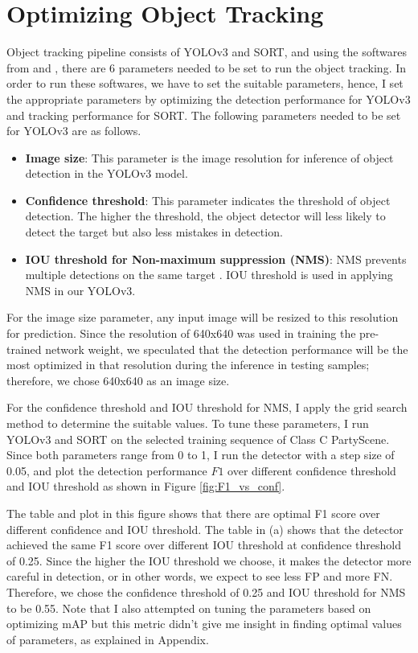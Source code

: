\section{Optimizing Object Tracking}
\label{sec:methods/section_b}

Object tracking pipeline consists of YOLOv3 and SORT, and using the softwares from \cite{jocher_ultralyticsyolov3_2021} and \cite{abewley_abewleysort_2021}, there are 6 parameters needed to be set to run the object tracking. In order to run these softwares, we have to set the suitable parameters, hence, I set the appropriate parameters by optimizing the detection performance for YOLOv3 and tracking performance for SORT. The following parameters needed to be set for YOLOv3 are as follows.
\begin{itemize}
    \item \textbf{Image size}: This parameter is the image resolution for inference of object detection in the YOLOv3 model.
    \item \textbf{Confidence threshold}: This parameter indicates the threshold of object detection. The higher the threshold, the object detector will less likely to detect the target but also less mistakes in detection.
    \item \textbf{IOU threshold for Non-maximum suppression (NMS)}: NMS prevents multiple detections on the same target \cite{redmon_you_2016}. IOU threshold is used in applying NMS in our YOLOv3.
\end{itemize}
For the image size parameter, any input image will be resized to this resolution for prediction. Since the resolution of 640x640 was used in training the pre-trained network weight, we speculated that the detection performance will be the most optimized in that resolution during the inference in testing samples; therefore, we chose 640x640 as an image size.

For the confidence threshold and IOU threshold for NMS, I apply the grid search method to determine the suitable values. To tune these parameters, I run YOLOv3 and SORT on the selected training sequence of Class C PartyScene. Since both parameters range from 0 to 1, I run the detector with a step size of 0.05, and plot the detection performance $F1$ over different confidence threshold and IOU threshold as shown in Figure \ref{fig:F1_vs_conf}.

The table and plot in this figure shows that there are optimal F1 score over different confidence and IOU threshold. The table in (a) shows that the detector achieved the same F1 score over different IOU threshold at confidence threshold of 0.25. Since the higher the IOU threshold we choose, it makes the detector more careful in detection, or in other words, we expect to see less FP and more FN. Therefore, we chose the confidence threshold of 0.25 and IOU threshold for NMS to be 0.55. Note that I also attempted on tuning the parameters based on optimizing mAP but this metric didn't give me insight in finding optimal values of parameters, as explained in Appendix.

